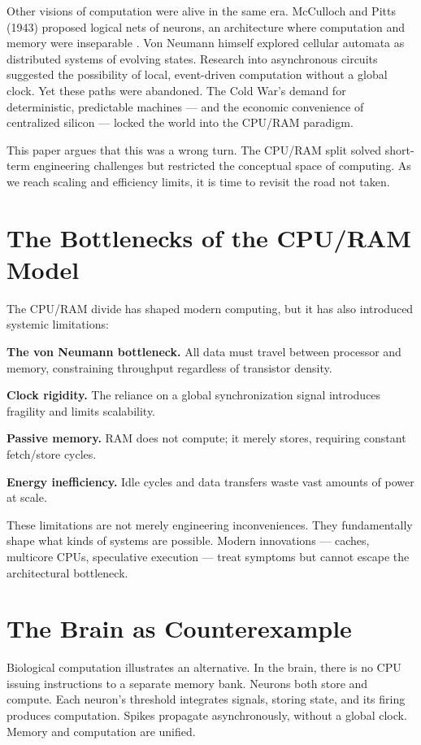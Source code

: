 \documentclass[conference]{IEEEtran}
\begin{document}
Other visions of computation were alive in the same era. McCulloch and Pitts (1943) proposed logical nets of neurons, an architecture where computation and memory were inseparable \cite{mcculloch1943}. Von Neumann himself explored cellular automata as distributed systems of evolving states. Research into asynchronous circuits suggested the possibility of local, event-driven computation without a global clock. Yet these paths were abandoned. The Cold War's demand for deterministic, predictable machines — and the economic convenience of centralized silicon — locked the world into the CPU/RAM paradigm.

This paper argues that this was a wrong turn. The CPU/RAM split solved short-term engineering challenges but restricted the conceptual space of computing. As we reach scaling and efficiency limits, it is time to revisit the road not taken.

\section{The Bottlenecks of the CPU/RAM Model}

The CPU/RAM divide has shaped modern computing, but it has also introduced systemic limitations:

\textbf{The von Neumann bottleneck.} All data must travel between processor and memory, constraining throughput regardless of transistor density.

\textbf{Clock rigidity.} The reliance on a global synchronization signal introduces fragility and limits scalability.

\textbf{Passive memory.} RAM does not compute; it merely stores, requiring constant fetch/store cycles.

\textbf{Energy inefficiency.} Idle cycles and data transfers waste vast amounts of power at scale.

These limitations are not merely engineering inconveniences. They fundamentally shape what kinds of systems are possible. Modern innovations — caches, multicore CPUs, speculative execution — treat symptoms but cannot escape the architectural bottleneck.

\section{The Brain as Counterexample}

Biological computation illustrates an alternative. In the brain, there is no CPU issuing instructions to a separate memory bank. Neurons both store and compute. Each neuron's threshold integrates signals, storing state, and its firing produces computation. Spikes propagate asynchronously, without a global clock. Memory and computation are unified.
\end{document}
